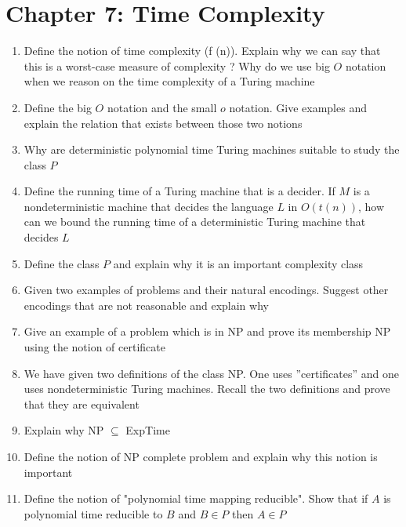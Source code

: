 \documentclass{article}
\begin{document}
\clearpage
\section{Chapter 7: Time Complexity}

\begin{enumerate}{}

\item Define the notion of time complexity (f (n)). Explain why we can say that this is a worst-case measure of complexity ? Why do we use big $O$ notation when we reason on the time complexity of a Turing machine 

\item Define the big $O$ notation and the small $o$ notation. Give examples and explain the relation that exists between those two notions

\item Why are deterministic polynomial time Turing machines suitable to study the class $P$

\item Define the running time of a Turing machine that is a decider. If $M$ is a nondeterministic machine that decides the language $L$ in $O(t(n))$, how can we bound the running time of a deterministic Turing machine that decides $L$

\item Define the class $P$ and explain why it is an important complexity class

\item Given two examples of problems and their natural encodings. Suggest other encodings that are not reasonable and explain why

\item Give an example of a problem which is in NP and prove its membership NP using the notion of certificate

\item We have given two definitions of the class NP. One uses ”certificates” and one uses nondeterministic Turing machines. Recall the two definitions and prove that they are equivalent

\item Explain why NP $\subseteq$ ExpTime

\item Define the notion of NP complete problem and explain why this notion is important

\item Define the notion of "polynomial time mapping reducible". Show that if $A$ is polynomial time reducible to $B$ and $B \in P$ then $A \in P$


\end{enumerate}
\end{document}
